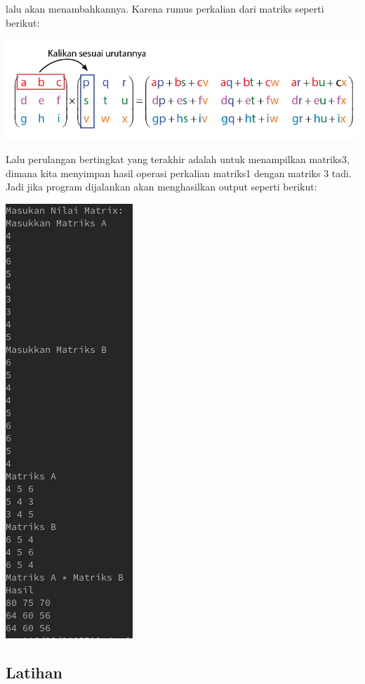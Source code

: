 \documentclass[a4paper,12pt]{article}
\begin{document}
lalu akan menambahkannya. Karena rumus perkalian dari matriks seperti berikut:
\begin{center}
    \includegraphics[width=\linewidth]{rumus.png}
\end{center}
Lalu perulangan bertingkat yang terakhir adalah untuk menampilkan matriks3, dimana kita menyimpan hasil operasi perkalian matriks1 dengan matriks 3 tadi. Jadi jika program dijalankan akan 
menghasilkan output seperti berikut:
\begin{center}
    \includegraphics{8.png}
\end{center}

\subsection{Latihan}
\end{document}
